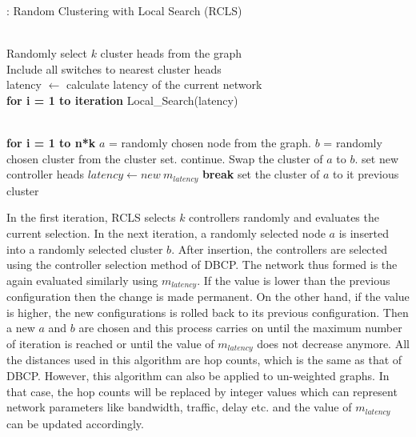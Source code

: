\documentclass[times]{dacauth}
\begin{document}
\begin{algorithm}
	\caption{: Random Clustering with Local Search (RCLS)}\label{rcls}
	\begin{algorithmic}[1]
		 \\
		Randomly select $k$ cluster heads from the graph \\
		Include all switches to nearest cluster heads \\
		latency $\gets$ calculate latency of the current network \\
		\textbf{for i = 1 to iteration}
		\State Local\_Search(latency) \\
		\EndProcedure
		
		 \\
		\textbf{for i = 1 to n*k}
		\State $a$ = randomly chosen node from the graph.
		\State $b$ = randomly chosen cluster from the cluster set.
		\State continue.
		\EndIf
		\State Swap the cluster of $a$ to $b$.
		\State set new controller heads
		\State $latency \gets new~m_{latency}$
		\State \textbf{break}
		\Else 
		\State set the cluster of $a$ to it previous cluster
		\EndIf
		\EndProcedure
	\end{algorithmic}
\end{algorithm}

\smallskip
In the first iteration, RCLS selects $k$ controllers randomly and evaluates the current selection. In the next iteration, a randomly selected node $a$ is inserted into a randomly selected cluster $b$. After insertion, the controllers are selected using the controller selection method of DBCP. The network thus formed is the again evaluated similarly using $m_{latency}$. If the value is lower than the previous configuration then the change is made permanent. On the other hand, if the value is higher, the new configurations is rolled back to its previous configuration. Then a new $a$ and $b$ are chosen and this process carries on until the maximum number of iteration is reached or until the value of $m_{latency}$ does not decrease anymore.
All the distances used in this algorithm are hop counts, which is the same as that of DBCP.
However, this algorithm can also be applied to un-weighted graphs. In that case, the hop counts will be replaced by integer values which can represent network parameters like bandwidth, traffic, delay etc. and the value of $m_{latency}$ can be updated accordingly.
\end{document}
